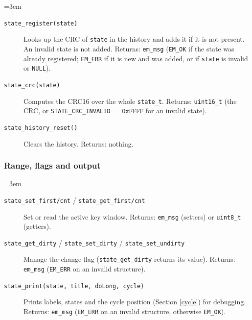 {\sloppy\emergencystretch=3em
\begin{description}
\item[\texttt{state\_register(state)}] Looks up the CRC of \verb|state| in the
  history and adds it if it is not present. An invalid state is not added.
  Returns: \verb|em_msg| (\verb|EM_OK| if the state was already registered;
  \verb|EM_ERR| if it is new and was added, or if \verb|state| is invalid or
  \verb|NULL|).
\item[\texttt{state\_crc(state)}] Computes the CRC16 over the whole
  \verb|state_t|. Returns: \verb|uint16_t| (the CRC, or
  \verb|STATE_CRC_INVALID| $= \mathtt{0xFFFF}$ for an invalid state).
\item[\texttt{state\_history\_reset()}] Clears the history. Returns: nothing.
\end{description}
\par}

\subsubsection*{Range, flags and output}
{\sloppy\emergencystretch=3em
\begin{description}
\item[\texttt{state\_set\_first/cnt} / \texttt{state\_get\_first/cnt}] Set or
  read the active key window. Returns: \verb|em_msg| (setters) or
  \verb|uint8_t| (getters).
\item[\texttt{state\_get\_dirty} / \texttt{state\_set\_dirty} /
  \texttt{state\_set\_undirty}] Manage the change flag (\verb|state_get_dirty|
  returns its value). Returns: \verb|em_msg| (\verb|EM_ERR| on an invalid
  structure).
\item[\texttt{state\_print(state, title, doLong, cycle)}] Prints labels,
  states and the cycle position (Section \ref{cycle}) for debugging. Returns:
  \verb|em_msg| (\verb|EM_ERR| on an invalid structure, otherwise \verb|EM_OK|).
\end{description}
\par}
